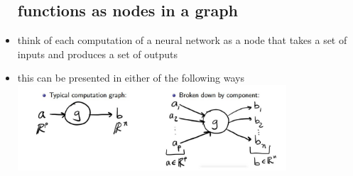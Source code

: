 \documentclass{article}
\begin{document}
\begin{itemize}
\subsection{functions as nodes in a graph}
\item think of each computation of a neural network as a node that takes a set of inputs and produces a set of outputs
\item this can be presented in either of the following ways\\ \includegraphics[width=10cm]{lecture_notes/lecture_11/immages/l11_11.JPG}

\end{itemize}
\end{document}
